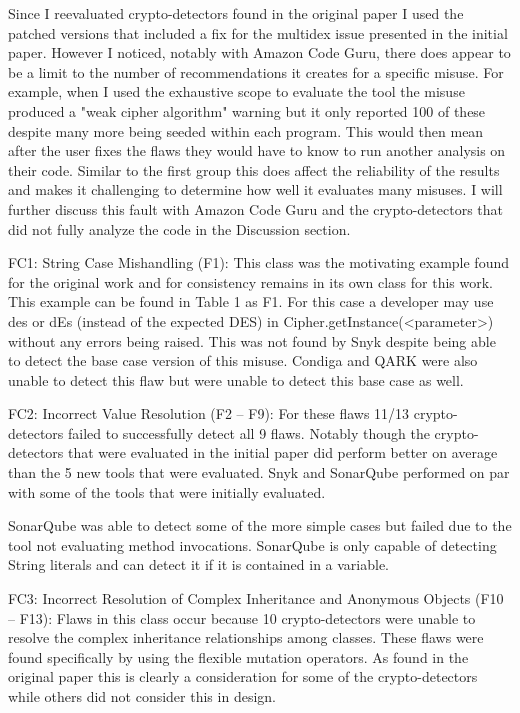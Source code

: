 Since I reevaluated crypto-detectors found in the original paper I used the patched versions that included a fix for the multidex issue presented in the initial paper. However I noticed, notably with Amazon Code Guru, there does appear to be a limit to the number of recommendations it creates for a specific misuse. For example, when I used the exhaustive scope to evaluate the tool the misuse produced a "weak cipher algorithm" warning but it only reported 100 of these despite many more being seeded within each program. This would then mean after the user fixes the flaws they would have to know to run another analysis on their code. Similar to the first group this does affect the reliability of the results and makes it challenging to determine how well it evaluates many misuses. I will further discuss this fault with Amazon Code Guru and the crypto-detectors that did not fully analyze the code in the Discussion section. 

FC1: String Case Mishandling (F1): This class was the motivating example found for the original work and for consistency remains in its own class for this work. This example can be found in Table 1 as F1. For this case a developer may use des or dEs (instead of the expected DES) in Cipher.getInstance(<parameter>) without any errors being raised. This was not found by Snyk despite being able to detect the base case version of this misuse. Condiga and QARK were also unable to detect this flaw but were unable to detect this base case as well.

FC2: Incorrect Value Resolution (F2 – F9): For these flaws 11/13 crypto-detectors failed to successfully detect all 9 flaws. Notably though the crypto-detectors that were evaluated in the initial paper did perform better on average than the 5 new tools that were evaluated. Snyk and SonarQube performed on par with some of the tools that were initially evaluated. 

SonarQube was able to detect some of the more simple cases but failed due to the tool not evaluating method invocations. SonarQube is only capable of detecting String literals and can detect it if it is contained in a variable. 

FC3: Incorrect Resolution of Complex Inheritance and Anonymous Objects (F10 – F13): Flaws in this class occur because 10 crypto-detectors were unable to resolve the complex inheritance relationships among classes. These flaws were found specifically by using the flexible mutation operators. As found in the original paper this is clearly a consideration for some of the crypto-detectors while others did not consider this in design. 

